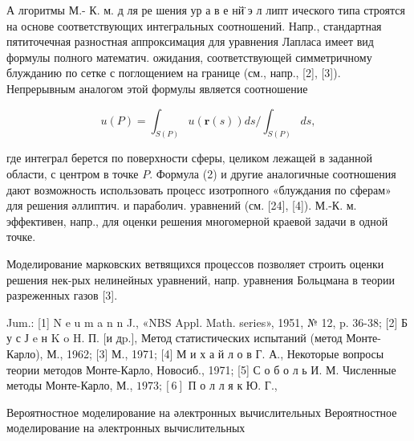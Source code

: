 \documentclass[10pt]{article}
\begin{document}
А лгоритмы М.- К. м. д ля ре шения ур а в е нй̈ э л липт ического типа строятся на основе соответствующих интегральных соотношений. Напр., стандартная пятиточечная разностная аппроксимация для уравнения Лапласа имеет вид формулы полного математич. ожидания, соответствующей симметричному блужданию по сетке с поглощением на границе (см., напр., [2], [3]). Непрерывным аналогом этой формулы является соотношение



\[

u(P)=\int_{S(P)} u(\boldsymbol{r}(s)) d s / \int_{S(P)} d s,

\]



где интеграл берется по поверхности сферы, целиком лежащей в заданной области, с центром в точке $P$. Формула (2) и другие аналогичные соотношения дают возможность использовать процесс изотропного «блуждания по сферам» для решения әллиптич. и параболич. уравнений (см. [24], [4]). М.-К. м. эффективен, напр., для оценки решения многомерной краевой задачи в одной точке.



Моделирование марковских ветвящихся процессов позволяет строить оценки решения нек-рых нелинейных уравнений, напр. уравнения Больцмана в теории разреженных газов [3].



Jum.: [1] N e u m a n n J., «NBS Appl. Math. series», 1951, № 12, p. 36-38; [2] Б у с Ј e н K o H. П. [и дp.], Метод статистических испытаний (метод Монте-Карло), М., 1962; [3] М., 1971; [4] М и х а й л о в Г. А., Некоторые вопросы теории методов Монте-Карло, Новосиб., 1971; [5] С о б о л ь И. М. Численные методы Монте-Карло, М., $1973 ;[6]$ П о л л я к Ю. Г.,

Вероятностное моделирование на әлектронных вычислительных Вероятностное моделирование на әлектронных вычислительных
\end{document}
